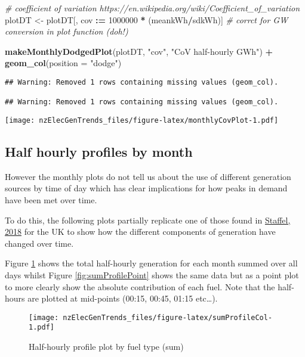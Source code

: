 \documentclass[]{article}
\newenvironment{Shaded}{\begin{snugshade}}{\end{snugshade}}
\newcommand{\KeywordTok}[1]{\textcolor[rgb]{0.13,0.29,0.53}{\textbf{#1}}}
\newcommand{\DataTypeTok}[1]{\textcolor[rgb]{0.13,0.29,0.53}{#1}}
\newcommand{\DecValTok}[1]{\textcolor[rgb]{0.00,0.00,0.81}{#1}}
\newcommand{\StringTok}[1]{\textcolor[rgb]{0.31,0.60,0.02}{#1}}
\newcommand{\CommentTok}[1]{\textcolor[rgb]{0.56,0.35,0.01}{\textit{#1}}}
\newcommand{\OperatorTok}[1]{\textcolor[rgb]{0.81,0.36,0.00}{\textbf{#1}}}
\newcommand{\ErrorTok}[1]{\textcolor[rgb]{0.64,0.00,0.00}{\textbf{#1}}}
\newcommand{\NormalTok}[1]{#1}
\theoremstyle{definition}
\theoremstyle{definition}
\theoremstyle{definition}
\theoremstyle{remark}
\begin{document}
\begin{Shaded}
\begin{Highlighting}[]
\CommentTok{# coefficient of variation https://en.wikipedia.org/wiki/Coefficient_of_variation}
\NormalTok{plotDT <-}\StringTok{ }\NormalTok{plotDT[, cov }\OperatorTok{:}\ErrorTok{=}\StringTok{ }\DecValTok{1000000} \OperatorTok{*}\StringTok{ }\NormalTok{(meankWh}\OperatorTok{/}\NormalTok{sdkWh)] }\CommentTok{# corrct for GW conversion in plot function (doh!)}

\KeywordTok{makeMonthlyDodgedPlot}\NormalTok{(plotDT, }\StringTok{"cov"}\NormalTok{, }\StringTok{"CoV half-hourly GWh"}\NormalTok{) }\OperatorTok{+}\StringTok{ }\KeywordTok{geom_col}\NormalTok{(}\DataTypeTok{position =} \StringTok{"dodge"}\NormalTok{)}
\end{Highlighting}
\end{Shaded}

\begin{verbatim}
## Warning: Removed 1 rows containing missing values (geom_col).

## Warning: Removed 1 rows containing missing values (geom_col).
\end{verbatim}

\texttt{[image: nzElecGenTrends\_files/figure-latex/monthlyCovPlot-1.pdf]}

\subsection{Half hourly profiles by
month}\label{half-hourly-profiles-by-month}

However the monthly plots do not tell us about the use of different
generation sources by time of day which has clear implications for how
peaks in demand have been met over time.

To do this, the following plots partially replicate one of those found
in
\href{https://www.sciencedirect.com/science/article/pii/S0301421516307017\#f0025}{Staffel,
2018} for the UK to show how the different components of generation have
changed over time.

Figure \ref{fig:sumProfileCol} shows the total half-hourly generation
for each month summed over all days whilst Figure
\ref{fig:sumProfilePoint} shows the same data but as a point plot to
more clearly show the absolute contribution of each fuel. Note that the
half-hours are plotted at mid-points (00:15, 00:45, 01:15 etc\ldots{}).

\begin{figure}
\centering
\texttt{[image: nzElecGenTrends\_files/figure-latex/sumProfileCol-1.pdf]}
\caption{\label{fig:sumProfileCol}Half-hourly profile plot by fuel type
(sum)}
\end{figure}
\end{document}
